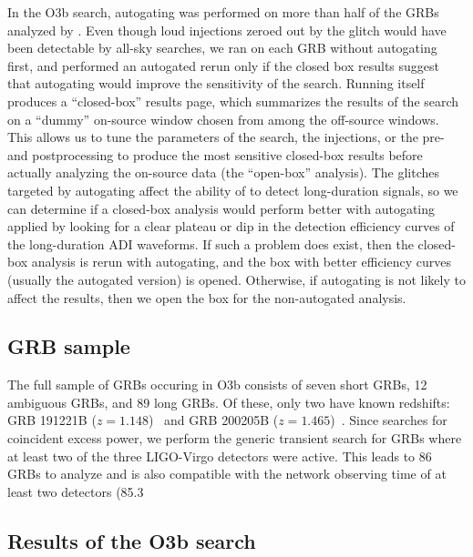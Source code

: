 In the O3b search, autogating was performed on more than half of the \acp{GRB} analyzed by \xpip.
Even though loud injections zeroed out by the glitch would have been detectable by all-sky searches, we ran \xpip on each \ac{GRB} without autogating first, and performed an autogated rerun only if the closed box results suggest that autogating would improve the sensitivity of the search.
Running \xpip itself produces a ``closed-box'' results page, which summarizes the results of the search on a ``dummy'' on-source window chosen from among the off-source windows.
This allows us to tune the parameters of the search, the injections, or the pre- and postprocessing to produce the most sensitive closed-box results before actually analyzing the on-source data (the ``open-box'' analysis).
The glitches targeted by autogating affect the ability of \xpip to detect long-duration signals, so we can determine if a closed-box analysis would perform better with autogating applied by looking for a clear plateau or dip in the detection efficiency curves of the long-duration \ac{ADI} waveforms.
If such a problem does exist, then the closed-box analysis is rerun with autogating, and the box with better efficiency curves (usually the autogated version) is opened.
Otherwise, if autogating is not likely to affect the results, then we open the box for the non-autogated analysis.


\subsection{GRB sample}\label{sec:grb-o3b-sample}

The full sample of \acp{GRB} occuring in O3b consists of seven short \acp{GRB}, 12 ambiguous \acp{GRB}, and 89 long \acp{GRB}.
Of these, only two have known redshifts: GRB 191221B ($z = 1.148$)~\citep{Kuin_2019, Vielfaure_2019} and GRB 200205B ($z = 1.465$)~\citep{Vielfaure_2020}.
Since \xpip searches for coincident excess power, we perform the generic transient search for \acp{GRB} where at least two of the three LIGO-Virgo detectors were active.
This leads to 86 GRBs to analyze and is also compatible with the network observing time of at least two detectors (85.3%

\subsection{Results of the O3b search}\label{sec:grb-o3b-results}

